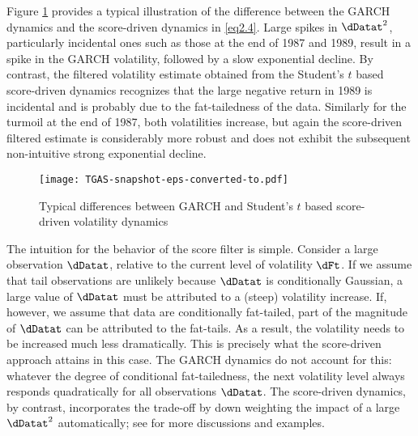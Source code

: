 Figure \ref{fig:TGAS} provides a typical illustration of the difference between the GARCH dynamics and the score-driven dynamics in \eqref{eq2.4}. Large spikes in $\dDatat^2$, particularly incidental ones such as those at the end of 1987 and 1989, result in a spike in the GARCH volatility, followed by a slow exponential decline. By contrast, the filtered volatility estimate obtained from the Student's $t$ based score-driven dynamics recognizes that the large negative return in 1989 is incidental and is probably due to the fat-tailedness of the data. Similarly for the turmoil at the end of 1987, both volatilities increase, but again the score-driven filtered estimate is considerably more robust and does not exhibit the subsequent non-intuitive strong exponential decline. 

\begin{figure}[!t]
	\centering
		\texttt{[image: TGAS-snapshot-eps-converted-to.pdf]}
	\caption{Typical differences between GARCH and Student's $t$ based score-driven volatility dynamics\label{fig:TGAS}}
\end{figure}

The intuition for the behavior of the score filter is simple. Consider a large observation $\dDatat$, relative to the current level of volatility $\dFt$.
If we assume that tail observations are unlikely because $\dDatat$ is conditionally Gaussian, a large value of $\dDatat$ must be attributed to a (steep) volatility increase.
If, however, we assume that data are conditionally fat-tailed, part of the magnitude of $\dDatat$ can be attributed to the fat-tails. As a result, the volatility needs to be increased much less dramatically.
This is precisely what the score-driven approach attains in this case.
The GARCH dynamics do not account for this: whatever the degree of conditional fat-tailedness, the next volatility level always responds quadratically for all observations $\dDatat$. 
The score-driven dynamics, by contrast, incorporates the trade-off by down weighting the impact of a large $\dDatat^2$ automatically; see \citet{CKL2011,CKL2013} for more discussions and examples.



